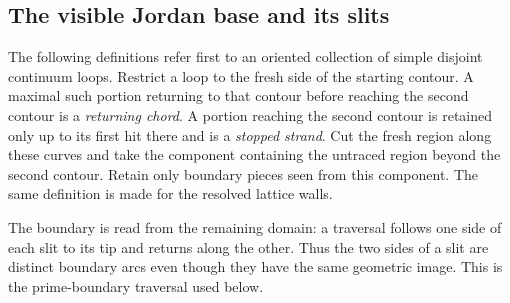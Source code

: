 \subsection{The visible Jordan base and its slits}

The following definitions refer first to an oriented collection of
simple disjoint continuum loops.  Restrict a loop to the fresh side of
the starting contour.  A maximal such portion returning to that contour
before reaching the second contour is a \emph{returning chord}.  A
portion reaching the second contour is retained only up to its first
hit there and is a \emph{stopped strand}.  Cut the fresh region along
these curves and take the component containing the untraced region
beyond the second contour.  Retain only boundary pieces seen from this
component.  The same definition is made for the resolved lattice walls.

The boundary is read from the remaining domain: a traversal follows
one side of each slit to its tip and returns along the other.
Thus the two sides of a slit are distinct boundary arcs even though
they have the same geometric image. This is the prime-boundary
traversal used below.


